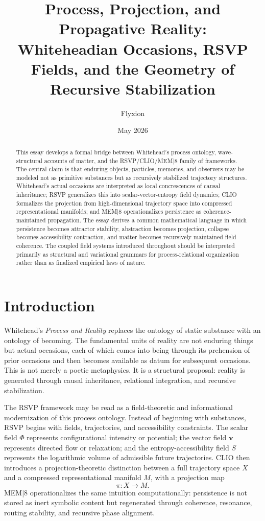 \documentclass[12pt,a4paper]{article}
\title{Process, Projection, and Propagative Reality:\\
Whiteheadian Occasions, RSVP Fields, and the Geometry of Recursive Stabilization}
\author{Flyxion}
\date{May 2026}
\begin{document}
\maketitle

\begin{abstract}
This essay develops a formal bridge between Whitehead's process ontology, wave-structural accounts of matter, and the RSVP/CLIO/MEM|8 family of frameworks. The central claim is that enduring objects, particles, memories, and observers may be modeled not as primitive substances but as recursively stabilized trajectory structures. Whitehead's actual occasions are interpreted as local concrescences of causal inheritance; RSVP generalizes this into scalar-vector-entropy field dynamics; CLIO formalizes the projection from high-dimensional trajectory space into compressed representational manifolds; and MEM|8 operationalizes persistence as coherence-maintained propagation. The essay derives a common mathematical language in which persistence becomes attractor stability, abstraction becomes projection, collapse becomes accessibility contraction, and matter becomes recursively maintained field coherence. The coupled field systems introduced throughout should be interpreted primarily as structural and variational grammars for process-relational organization rather than as finalized empirical laws of nature.
\end{abstract}

\newpage

\section{Introduction}

Whitehead's \emph{Process and Reality} replaces the ontology of static substance with an ontology of becoming. The fundamental units of reality are not enduring things but actual occasions, each of which comes into being through its prehension of prior occasions and then becomes available as datum for subsequent occasions. This is not merely a poetic metaphysics. It is a structural proposal: reality is generated through causal inheritance, relational integration, and recursive stabilization.

The RSVP framework may be read as a field-theoretic and informational modernization of this process ontology. Instead of beginning with substances, RSVP begins with fields, trajectories, and accessibility constraints. The scalar field \(\Phi\) represents configurational intensity or potential; the vector field \(\mathbf{v}\) represents directed flow or relaxation; and the entropy-accessibility field \(S\) represents the logarithmic volume of admissible future trajectories. CLIO then introduces a projection-theoretic distinction between a full trajectory space \(X\) and a compressed representational manifold \(M\), with a projection map
\[
\pi : X \to M.
\]
MEM|8 operationalizes the same intuition computationally: persistence is not stored as inert symbolic content but regenerated through coherence, resonance, routing stability, and recursive phase alignment.
\end{document}

